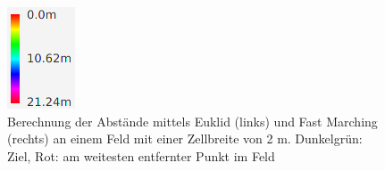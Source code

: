 \begin{figure}
\begin{minipage}{.44\textwidth}
\end{minipage}
\begin{minipage}{.1\textwidth}
\centering
  \includegraphics[width=\linewidth]{abbildungen/vergleich_euklid_fast_marching/farbskala.png}
\end{minipage}
\caption{Berechnung der Abstände mittels Euklid (links) und Fast Marching (rechts) an einem Feld mit einer Zellbreite von 2 m. Dunkelgrün: Ziel, Rot: am weitesten entfernter Punkt im Feld}
\label{fig_euklid_fast_marching_2m_cellsize}
\end{figure}



